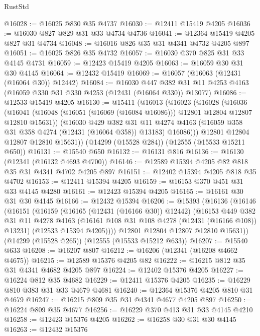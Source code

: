 \begin{lexlean}{RustStd}
\begin{coremodule}
@16028 := @16025 @830 @35 @4737
@16030 := @12411 @15419 @4205
@16036 := @16030 @827 @829 @31 @33 @4734 @4736
@16041 := @12364 @15419 @4205 @827 @31 @4734
@16048 := @16016 @826 @35 @31 @4341 @4732 @4205 @897
@16051 := @16025 @826 @35 @4732
@16057 := @16030 @370 @825 @31 @33 @4145 @4731
@16059 := @12423 @15419 @4205
@16063 := @16059 @30 @31 @30 @4145
@16064 := @12432 @15419
@16069 := @16057 (@16063 (@12431 (@16064 @30)) @12442)
@16084 := @16030
    @447
    @382
    @31
    @11
    @4253
    @4163
    (@16059 @330 @31 @330 @4253 (@12431 (@16064 @330)) @13077)
@16086 := @12533 @15419 @4205
@16130 := @15411
    (@16013
      (@16023
        (@16028
          (@16036
            (@16041 (@16048 (@16051 (@16069 (@16084 @16086))) @12801 @12804 @12807 @12810 @15631))
            (@16030
              @429
              @382
              @31
              @11
              @4274
              @4163
              (@16059 @358 @31 @358 @4274 (@12431 (@16064 @358)) @13183)
              @16086)))
        @12801
        @12804
        @12807
        @12810
        @15631))
    (@14299 (@15528 @284))
    (@12555 (@15533 @15211 @650))
@16131 := @15540 @650
@16132 := @16131 @816
@16136 := @16130 (@12341 (@16132 @4693 @4700))
@16146 := @12589 @15394 @4205 @82 @818 @35 @31 @4341 @4702 @4205 @897
@16151 := @12402 @15394 @4205 @818 @35 @4702
@16153 := @12411 @15394 @4205
@16159 := @16153 @370 @451 @31 @33 @4145 @4280
@16161 := @12423 @15394 @4205
@16165 := @16161 @30 @31 @30 @4145
@16166 := @12432 @15394
@16206 := @15393
    (@16136
      (@16146
        (@16151
          (@16159
            (@16165 (@12431 (@16166 @30)) @12442)
            (@16153
              @449
              @382
              @31
              @11
              @4278
              @4163
              (@16161 @108 @31 @108 @4278 (@12431 (@16166 @108)) @13231)
              (@12533 @15394 @4205))))
        @12801
        @12804
        @12807
        @12810
        @15631))
    (@14299 (@15528 @265))
    (@12555 (@15533 @15212 @633))
@16207 := @15540 @633
@16208 := @16207 @807
@16212 := @16206 (@12341 (@16208 @4662 @4675))
@16215 := @12589 @15376 @4205 @82
@16222 := @16215 @812 @35 @31 @4341 @4682 @4205 @897
@16224 := @12402 @15376 @4205
@16227 := @16224 @812 @35 @4682
@16229 := @12411 @15376 @4205
@16235 := @16229 @810 @383 @31 @33 @4679 @4681
@16240 := @12364 @15376 @4205 @810 @31 @4679
@16247 := @16215 @809 @35 @31 @4341 @4677 @4205 @897
@16250 := @16224 @809 @35 @4677
@16256 := @16229 @370 @413 @31 @33 @4145 @4210
@16258 := @12423 @15376 @4205
@16262 := @16258 @30 @31 @30 @4145
@16263 := @12432 @15376

\end{coremodule}
\end{lexlean}
